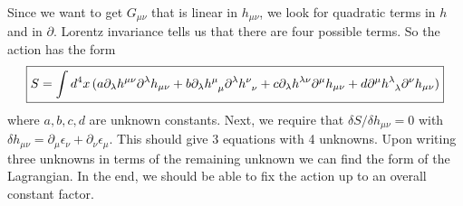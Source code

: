 \documentclass{book}
\theoremstyle{definition}
\newcommand{\p}{\partial}
\begin{document}
Since we want to get $G_{\mu\nu}$ that is linear in $h_{\mu\nu}$, we look for quadratic terms in $h$ and in $\p$. Lorentz invariance tells us that there are four possible terms. So the action has the form
\begin{align}
\boxed{S = \int d^4x\,(a\p_\lambda h^{\mu\nu}\p^\lambda h_{\mu\nu} + b \p_\lambda \tensor{h}{^\mu_\mu} \p^\lambda \tensor{h}{^\nu_\nu} + c\p_\lambda h^{\lambda \nu}\p^\mu h_{\mu\nu} + d\p^\mu\tensor{h}{^\lambda_\lambda}\p^\nu h_{\mu\nu} )}
\end{align}
where $a,b,c,d$ are unknown constants. Next, we require that $\delta S / \delta h_{\mu\nu} =0 $ with $\delta h_{\mu\nu} = \p_\mu \epsilon_\nu + \p_\nu \epsilon_\mu$. This should give 3 equations with 4 unknowns. Upon writing three unknowns in terms of the remaining unknown we can find the form of the Lagrangian. In the end, we should be able to fix the action up to an overall constant factor.\\
\end{document}
